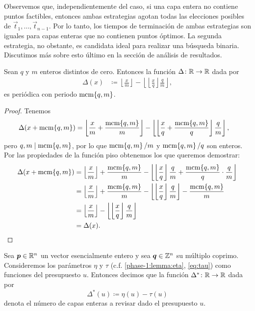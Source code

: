 Observemos que, independientemente del caso, si una capa entera no contiene puntos factibles,
entonces ambas estrategias agotan todas las elecciones posibles de $\vec{t}_1, \ldots,
\vec{t}_{n-1}$. Por lo tanto, los tiempos de terminación de ambas estrategias son iguales para capas
enteras que no contienen puntos óptimos. La segunda estrategia, no obstante, es candidata ideal para
realizar una búsqueda binaria. Discutimos más sobre esto último en la sección de análisis de
resultados.

\begin{lemma}
	\label{lemma:layer-dist}
	Sean $q$ y $m$ enteros distintos de cero. Entonces la función $\Delta \colon \mathbb{R} \to \mathbb{R}$ dada por
	\begin{align*}
		\Delta(x) &\coloneq \left\lfloor \frac{x}{m} \right\rfloor - \left\lfloor \left\lfloor
		\frac{x}{q} \right\rfloor \frac{q}{m} \right\rfloor,
	\end{align*}
	es periódica con periodo $\mathop{\mathrm{mcm}{\left\lbrace q, m \right\rbrace}}$.
\end{lemma}
\begin{proof}
	Tenemos
	\begin{align*}
		\Delta(x + \mathop{\mathrm{mcm}{\left\lbrace q, m \right\rbrace}})
		&= \left\lfloor \frac{x}{m} + \frac{\mathop{\mathrm{mcm}{\left\lbrace q, m \right\rbrace}}}{m} \right\rfloor
		- \left\lfloor \left\lfloor \frac{x}{q} + \frac{\mathop{\mathrm{mcm}{\left\lbrace q,m \right\rbrace}}}{q} \right\rfloor \frac{q}{m}
			\right\rfloor,
	\end{align*}
	pero $q, m \mid \mathop{\mathrm{mcm}{\left\lbrace q, m \right\rbrace}}$, por lo que $\mathop{\mathrm{mcm}{\left\lbrace q,m \right\rbrace}}/m$ y $\mathop{\mathrm{mcm}{\left\lbrace q,m \right\rbrace}}/q$ son enteros. Por las
	propiedades de la función piso obtenemos los que queremos demostrar:
	\begin{align*}
		\Delta(x + \mathop{\mathrm{mcm}{\left\lbrace q,m \right\rbrace}})
		&=
		\left\lfloor \frac{x}{m} \right\rfloor + \frac{\mathop{\mathrm{mcm}{\left\lbrace q,m \right\rbrace}}}{m}
		- \left\lfloor \left\lfloor \frac{x}{q} \right\rfloor\frac{q}{m} + 
			\frac{\mathop{\mathrm{mcm}{\left\lbrace q,m \right\rbrace}}}{q}\cdot\frac{q}{m} \right\rfloor \\
		&= 
		\left\lfloor \frac{x}{m} \right\rfloor + \frac{\mathop{\mathrm{mcm}{\left\lbrace q,m \right\rbrace}}}{m}
		- \left\lfloor \left\lfloor \frac{x}{q} \right\rfloor\frac{q}{m}\right\rfloor
		- \frac{\mathop{\mathrm{mcm}{\left\lbrace q,m \right\rbrace}}}{m} \\
		&= 
		\left\lfloor \frac{x}{m} \right\rfloor
		- \left\lfloor \left\lfloor \frac{x}{q} \right\rfloor\frac{q}{m}\right\rfloor \\
		&= \Delta(x).
	\end{align*}
\end{proof}
\begin{definition}
	Sea $\boldsymbol{p} \in \mathbb{R}^n$ un vector esencialmente entero y sea $\boldsymbol{q} \in \mathbb{Z}^n$ su múltiplo
	coprimo. Consideremos los parámetros $\eta$ y $\tau$ (c.f. \ref{phase-1:lemma:eta},
	\ref{eq:tau}) como funciones del presupuesto $u$. Entonces decimos que la función $\Delta^*
	\colon \mathbb{R} \to \mathbb{R}$ dada por
	\begin{equation}
		\label{eq:dist-layers}
		\Delta^*(u) \coloneq \eta(u) - \tau(u)
	\end{equation}
	denota el número de capas enteras a revisar dado el presupuesto $u$.
\end{definition}

